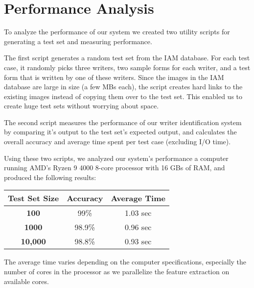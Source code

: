 \section{Performance Analysis}
To analyze the performance of our system we created two utility scripts for generating a test set and measuring performance. 

The first script generates a random test set from the IAM database. For each test case, it randomly picks three writers, two sample forms for each writer, and a test form that is written by one of these writers. Since the images in the IAM database are large in size (a few MBs each), the script creates hard links to the existing images instead of copying them over to the test set. This enabled us to create huge test sets without worrying about space.

The second script measures the performance of our writer identification system by comparing it's output to the test set's expected output, and calculates the overall accuracy and average time spent per test case (excluding I/O time).

Using these two scripts, we analyzed our system's performance a computer running AMD's Ryzen 9 4000 8-core processor with 16 GBs of RAM, and produced the following results: \\

\begin{table}[h]  \centering
\begin{tabular}{|c|c|c|}
    \hline
    \cellcolor[HTML]{C0C0C0} \textbf{Test Set Size} & 
    \cellcolor[HTML]{C0C0C0} \textbf{Accuracy} & 
    \cellcolor[HTML]{C0C0C0} \textbf{Average Time}\\
    \hline
    \cellcolor[HTML]{C0C0C0} \textbf{100} & 99\% & 1.03 sec\\ \hline
    \cellcolor[HTML]{C0C0C0} \textbf{1000} & 98.9\% & 0.96 sec \\ \hline
    \cellcolor[HTML]{C0C0C0} \textbf{10,000} &  98.8\% & 0.93 sec \\ \hline
\end{tabular}
\end{table}

The average time varies depending on the computer specifications, especially the number of cores in the processor as we parallelize the feature extraction on available cores.